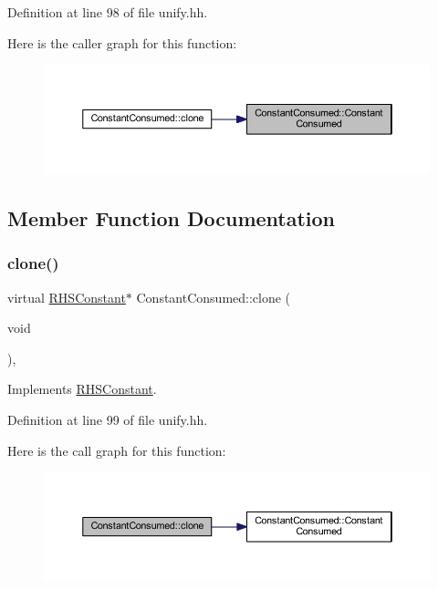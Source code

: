 Definition at line 98 of file unify.\+hh.

Here is the caller graph for this function\+:
\nopagebreak
\begin{figure}[H]
\begin{center}
\leavevmode
\includegraphics[width=350pt]{class_constant_consumed_aba7185564e48c539c5a913e08a190edf_icgraph}
\end{center}
\end{figure}


\subsection{Member Function Documentation}
\mbox{\label{class_constant_consumed_acb2b2e7bbebab6c8b925819d9a6e05a5}} 
\subsubsection{\texorpdfstring{clone()}{clone()}}
{\footnotesize\ttfamily virtual \mbox{\hyperlink{class_r_h_s_constant}{R\+H\+S\+Constant}}$\ast$ Constant\+Consumed\+::clone (\begin{DoxyParamCaption}\item[{void}]{ }\end{DoxyParamCaption})\hspace{0.3cm}{\ttfamily [inline]}, {\ttfamily [virtual]}}



Implements \mbox{\hyperlink{class_r_h_s_constant_a3e43335a89351a453932a8c0544d5722}{R\+H\+S\+Constant}}.



Definition at line 99 of file unify.\+hh.

Here is the call graph for this function\+:
\nopagebreak
\begin{figure}[H]
\begin{center}
\leavevmode
\includegraphics[width=350pt]{class_constant_consumed_acb2b2e7bbebab6c8b925819d9a6e05a5_cgraph}
\end{center}
\end{figure}
\mbox{\label{class_constant_consumed_a20ea358cc8895b5f58a59e9de98474f2}} 
